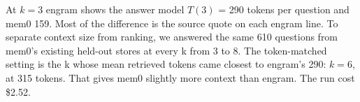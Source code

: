 \documentclass[11pt]{article}
\newcommand{\src}[1]{}
\begin{document}
At $k{=}$3 engram shows the answer model $T(3)$ = 290\src{bench/results/heldout\_report.json} tokens per question and mem0 159\src{bench/results/heldout\_report.json}. Most of the difference is the source quote on each engram line. To separate context size from ranking, we answered the same 610\src{bench/results/heldout\_report.json} questions from mem0's existing held-out stores at every k from 3 to 8. The token-matched setting is the k whose mean retrieved tokens came closest to engram's 290\src{bench/results/mem0\_token\_matched\_\_heldout\_pooled\_\_k6.json}: $k{=}$6\src{bench/results/mem0\_token\_matched\_\_heldout\_pooled\_\_k6.json}, at 315\src{bench/results/mem0\_token\_matched\_\_heldout\_pooled\_\_k6.json} tokens. That gives mem0 slightly more context than engram. The run cost \$2.52\src{bench/results/mem0\_token\_matched\_\_heldout\_pooled\_\_k6.json}.
\end{document}
